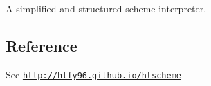 A simplified and structured scheme interpreter.

\subsection*{Reference}

See \href{http://htfy96.github.io/htscheme}{\tt http\+://htfy96.\+github.\+io/htscheme} 